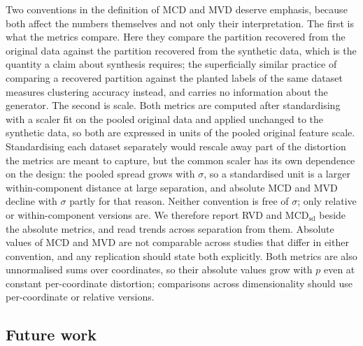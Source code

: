 \documentclass[pdflatex,referee]{sn-jnl}
\begin{document}
Two conventions in the definition of MCD and MVD deserve emphasis, because both
affect the numbers themselves and not only their interpretation. The first is
what the metrics compare. Here they compare the partition recovered from the
original data against the partition recovered from the synthetic data, which is
the quantity a claim about synthesis requires; the superficially similar
practice of comparing a recovered partition against the planted labels of the
same dataset measures clustering accuracy instead, and carries no information
about the generator. The second is scale. Both metrics are computed after
standardising with a scaler fit on the pooled original data and applied
unchanged to the synthetic data, so both are expressed in units of the pooled
original feature scale. Standardising each dataset separately would rescale
away part of the distortion the metrics are meant to capture, but the common
scaler has its own dependence on the design: the pooled spread grows with
$\sigma$, so a standardised unit is a larger within-component distance at
large separation, and absolute MCD and MVD decline with $\sigma$ partly for
that reason. Neither convention is free of $\sigma$; only relative or
within-component versions are. We therefore report RVD and
$\mathrm{MCD}_{\mathrm{sd}}$ beside the absolute metrics, and read trends
across separation from them. Absolute values of MCD and MVD are not
comparable across studies that differ in either convention, and any
replication should state both explicitly. Both metrics are also unnormalised
sums over coordinates, so their absolute values grow with $p$ even at constant
per-coordinate distortion; comparisons across dimensionality should use
per-coordinate or relative versions.

\subsection{Future work}
\label{sec:future}
\end{document}
